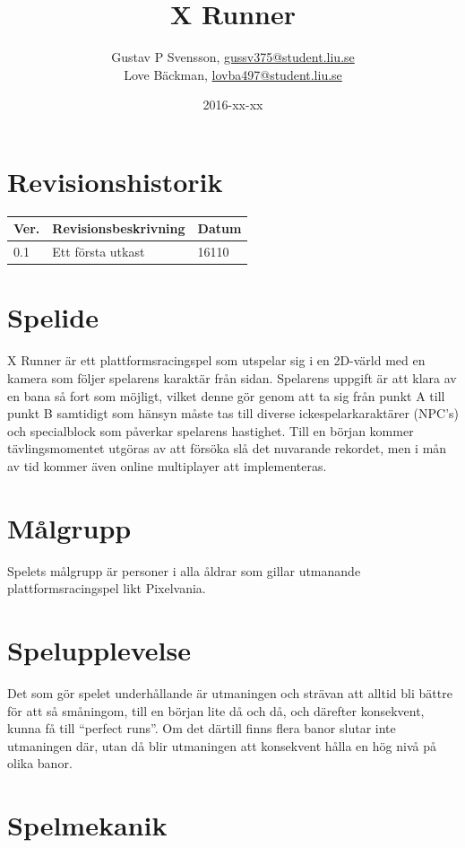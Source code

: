 \documentclass{TDP003mall}
\author{Gustav P Svensson, \url{gussv375@student.liu.se}\\
  Love Bäckman, \url{lovba497@student.liu.se}}
\title{X Runner}
\date{2016-xx-xx}
\begin{document}
\projectpage

\tableofcontents
\newpage

\section{Revisionshistorik}
\begin{table}[!h]
\begin{tabularx}{\linewidth}{|l|X|l|}
\hline
Ver. & Revisionsbeskrivning & Datum \\\hline
0.1 & Ett första utkast & 16110 \\\hline
\end{tabularx}
\end{table}


\section{Spelide}
X Runner är ett plattformsracingspel som utspelar sig i en 2D-värld med en kamera som följer spelarens karaktär från sidan. Spelarens uppgift är att klara av en bana så fort som möjligt, vilket denne gör genom att ta sig från punkt A till punkt B samtidigt som hänsyn måste tas till diverse ickespelarkaraktärer (NPC's) och specialblock som påverkar spelarens hastighet. Till en början kommer tävlingsmomentet utgöras av att försöka slå det nuvarande rekordet, men i mån av tid kommer även online multiplayer att implementeras.

\section{Målgrupp}
Spelets målgrupp är personer i alla åldrar som gillar utmanande plattformsracingspel likt Pixelvania.

\section{Spelupplevelse}
Det som gör spelet underhållande är utmaningen och strävan att alltid bli bättre för att så småningom, till en början lite då och då, och därefter konsekvent, kunna få till ``perfect runs''. Om det därtill finns flera banor slutar inte utmaningen där, utan då blir utmaningen att konsekvent hålla en hög nivå på olika banor.

\newpage

\section{Spelmekanik}
\end{document}
